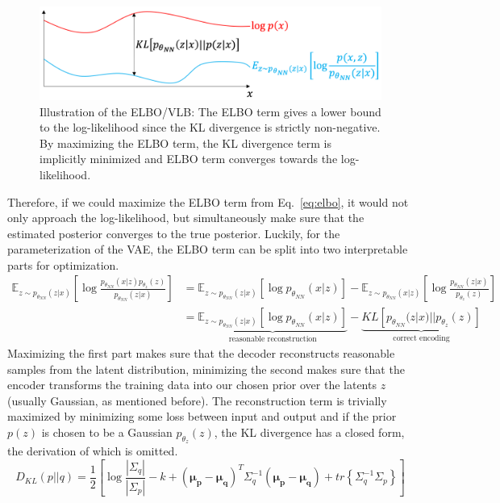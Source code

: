 \begin{figure}[h]
    \centering
    \includegraphics[width=.5\textwidth]{images/elbo.png}
    \caption[Illustration of the ELBO/VLB]{Illustration of the ELBO/VLB: The ELBO term gives a lower bound to the log-likelihood since the KL divergence is strictly non-negative. By maximizing the ELBO term, the KL divergence term is implicitly minimized and ELBO term converges towards the log-likelihood.}
    \label{fig:elbo}
\end{figure}
Therefore, if we could maximize the ELBO term from Eq.~\ref{eq:elbo}, it would not only approach the log-likelihood, but simultaneously make sure that the estimated posterior converges to the true posterior. Luckily, for the parameterization of the VAE, the ELBO term can be split into two interpretable parts for optimization.
\begin{align}
    \mathbb{E}_{z\sim p_{\theta_{NN}}(z|x)}\left[\log\frac{p_{\theta_{NN}}(x|z) p_{\theta_z}(z)}{p_{\theta_{NN}}(z|x)}\right] & = \mathbb{E}_{z\sim p_{\theta_{NN}}(z|x)}\left[\log p_{\theta_{NN}}(x|z)\right] - \mathbb{E}_{z\sim p_{\theta_{NN}}(x|z)}\left[\log \frac{p_{\theta_{NN}}(z|x)}{p_{\theta_{z}}(z)}\right]                                        \\
                                                                                                                              & = \underbrace{\mathbb{E}_{z\sim p_{\theta_{NN}}(z|x)}\left[\log p_{\theta_{NN}}(x|z)\right]}_{\text{reasonable reconstruction}} - \underbrace{KL \left[p_{\theta_{NN}}(z|x)||p_{\theta_{z}}(z)\right]}_{\text{correct encoding}}
\end{align}
Maximizing the first part makes sure that the decoder reconstructs reasonable samples from the latent distribution, minimizing the second makes sure that the encoder transforms the training data into our chosen prior over the latents $z$ (usually Gaussian, as mentioned before). The reconstruction term is trivially maximized by minimizing some loss between input and output and if the prior $p(z)$ is chosen to be a Gaussian $p_{\theta_{z}}(z)$, the KL divergence has a closed form, the derivation of which is omitted.~\autocite{mreasykldivergence}
\begin{equation}
    D_{KL}(p||q) = \frac{1}{2}\left[\log\frac{|\Sigma_q|}{|\Sigma_p|} - k + (\boldsymbol{\mu_p}-\boldsymbol{\mu_q})^T\Sigma_q^{-1}(\boldsymbol{\mu_p}-\boldsymbol{\mu_q}) + tr\left\{\Sigma_q^{-1}\Sigma_p\right\}\right]
\end{equation}

